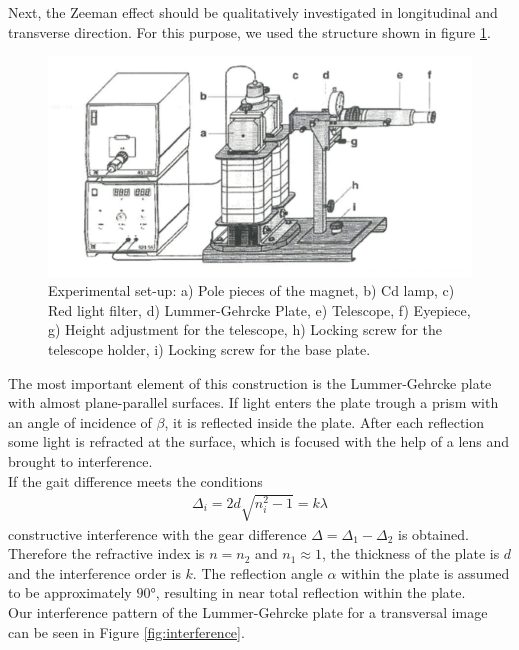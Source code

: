 Next, the Zeeman effect should be qualitatively investigated in longitudinal and transverse direction.
For this purpose, we used the structure shown in figure \ref{fig:structure}.
\begin{figure}[ht]
\centering
\includegraphics[scale=.9]{images//structure.png}
\caption{Experimental set-up: a) Pole pieces of the magnet, b) Cd lamp, c) Red light filter, d) Lummer-Gehrcke Plate, e) Telescope, f) Eyepiece, g) Height adjustment for the telescope, h) Locking screw for the telescope holder, i) Locking screw for the base plate. \cite{leaflets}}
\label{fig:structure}
\end{figure}
The most important element of this construction is the Lummer-Gehrcke plate with almost plane-parallel surfaces.
If light enters the plate trough a prism with an angle of incidence of $\beta$, it is reflected inside the plate.
After each reflection some light is refracted at the surface, which is focused with the help of a lens and brought to interference.\\
If the gait difference meets the conditions
\begin{align}
\Delta_i = 2d\sqrt{n_i^2-1} = k \lambda
\end{align}
constructive interference with the gear difference $\Delta=\Delta_1-\Delta_2$ is obtained. Therefore the refractive index is $n=n_2$ and $n_1\approx\num{1}$, the thickness of the plate is $d$ and the interference order is $k$.
The reflection angle $\alpha$ within the plate is assumed to be approximately $\ang{90}$, resulting in near total reflection within the plate.\\
Our interference pattern of the Lummer-Gehrcke plate for a transversal image can be seen in Figure \ref{fig:interference}.
